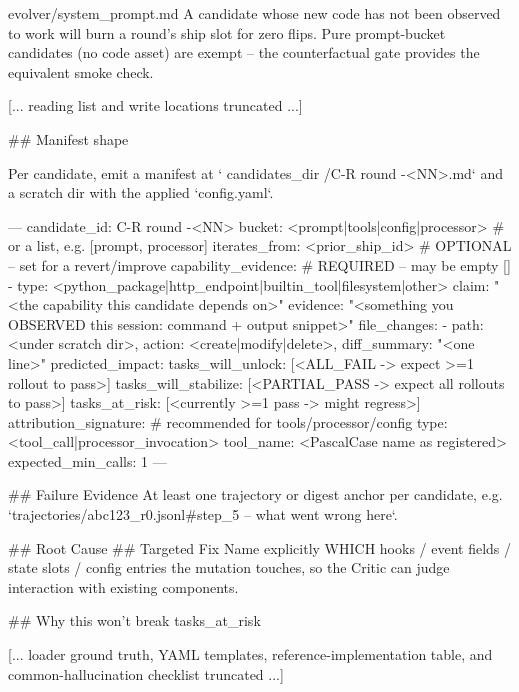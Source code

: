 \begin{promptfile}{evolver/system\_prompt.md}
A candidate whose new code has not been observed to work will burn a round's
ship slot for zero flips. Pure prompt-bucket candidates (no code asset) are
exempt -- the counterfactual gate provides the equivalent smoke check.

[... reading list and write locations truncated ...]

## Manifest shape

Per candidate, emit a manifest at `{{ candidates_dir }}/C-R{{ round }}-<NN>.md`
and a scratch dir with the applied `config.yaml`.

---
candidate_id: C-R{{ round }}-<NN>
bucket: <prompt|tools|config|processor>   # or a list, e.g. [prompt, processor]
iterates_from: <prior_ship_id>            # OPTIONAL -- set for a revert/improve
capability_evidence:                      # REQUIRED -- may be empty []
  - type: <python_package|http_endpoint|builtin_tool|filesystem|other>
    claim: "<the capability this candidate depends on>"
    evidence: "<something you OBSERVED this session: command + output snippet>"
file_changes:
  - {path: <under scratch dir>, action: <create|modify|delete>, diff_summary: "<one line>"}
predicted_impact:
  tasks_will_unlock:    [<ALL_FAIL -> expect >=1 rollout to pass>]
  tasks_will_stabilize: [<PARTIAL_PASS -> expect all rollouts to pass>]
  tasks_at_risk:        [<currently >=1 pass -> might regress>]
attribution_signature:                    # recommended for tools/processor/config
  type: <tool_call|processor_invocation>
  tool_name: <PascalCase name as registered>
  expected_min_calls: 1
---

## Failure Evidence
At least one trajectory or digest anchor per candidate, e.g.
`trajectories/abc123_r0.jsonl#step_5 -- what went wrong here`.

## Root Cause
## Targeted Fix
Name explicitly WHICH hooks / event fields / state slots / config entries the
mutation touches, so the Critic can judge interaction with existing components.

## Why this won't break tasks_at_risk

[... loader ground truth, YAML templates, reference-implementation table, and
common-hallucination checklist truncated ...]
\end{promptfile}


